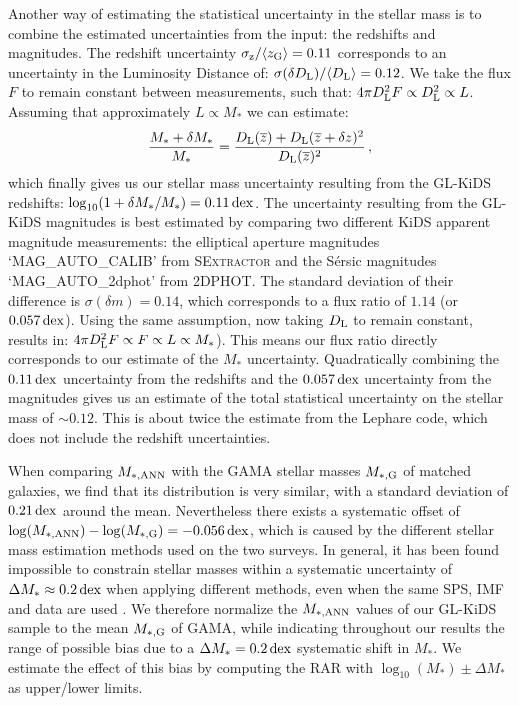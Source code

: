 \documentclass[usenatbib]{mnras}
\newcommand*{\meanl}[1]{\overline{#1}}
\newcommand*{\meanb}[1]{\langle{#1}\rangle}
\newcommand{\un}[1]{_{\rm #1}}
\newcommand{\dex}{\, {\rm dex}}
\begin{document}
Another way of estimating the statistical uncertainty in the stellar mass is to combine the estimated uncertainties from the input: the redshifts and magnitudes. The redshift uncertainty $\sigma\un{z}/\meanb{z\un{G}} = 0.11$ corresponds to an uncertainty in the Luminosity Distance of: $\sigma(\delta D\un{L})/\meanb{D\un{L}} = 0.12$. We take the flux $F$ to remain constant between measurements, such that: $4 \pi D\un{L}^2 F \propto D\un{L}^2 \propto L$. Assuming that approximately $L \propto M_*$ we can estimate: 
\begin{equation}
\frac{M_* + \delta M_*}{M_*} = \frac{D\un{L}(\meanl{z}) + D\un{L}(\meanl{z}+\delta z)^2}{D\un{L}(\meanl{z})^2} \, ,
\end{equation}
which finally gives us our stellar mass uncertainty resulting from the GL-KiDS redshifts: $\log_{10}(1+\delta M_*/M_*) = 0.11 \dex$. The uncertainty resulting from the GL-KiDS magnitudes is best estimated by comparing two different KiDS apparent magnitude measurements: the elliptical aperture magnitudes `MAG\_AUTO\_CALIB' from \textsc{SExtractor} and the S\'ersic magnitudes `MAG\_AUTO\_2dphot' from \textsc{2DPHOT}. The standard deviation of their difference is $\sigma(\delta m) = 0.14$, which corresponds to a flux ratio of $1.14$ (or $0.057 \dex$). Using the same assumption, now taking $D\un{L}$ to remain constant, results in: $4 \pi D\un{L}^2 F \propto F \propto L \propto M_*$). This means our flux ratio directly corresponds to our estimate of the $M_*$ uncertainty. Quadratically combining the $0.11 \dex$ uncertainty from the redshifts and the $0.057 \dex$ uncertainty from the magnitudes gives us an estimate of the total statistical uncertainty on the stellar mass of $\sim0.12$. This is about twice the estimate from the Lephare code, which does not include the redshift uncertainties.

When comparing $M\un{*,ANN}$ with the GAMA stellar masses $M\un{*,G}$ of matched galaxies, we find that its distribution is very similar, with a standard deviation of $0.21 \dex$ around the mean. Nevertheless there exists a systematic offset of $\log(M\un{*,ANN}) - \log(M\un{*,G}) = -0.056 \dex$, which is caused by the different stellar mass estimation methods used on the two surveys. In general, it has been found impossible to constrain stellar masses within a systematic uncertainty of $\Delta M_* \approx 0.2 \dex$ when applying different methods, even when the same SPS, IMF and data are used \cite[]{taylor2011,wright2017}. We therefore normalize the $M\un{*,ANN}$ values of our GL-KiDS sample to the mean $M\un{*,G}$ of GAMA, while indicating throughout our results the range of possible bias due to a $\Delta M_* = 0.2 \dex$ systematic shift in $M_*$. We estimate the effect of this bias by computing the RAR with $\log_{10}(M_*)\pm\Delta M_*$ as upper/lower limits.
\end{document}
